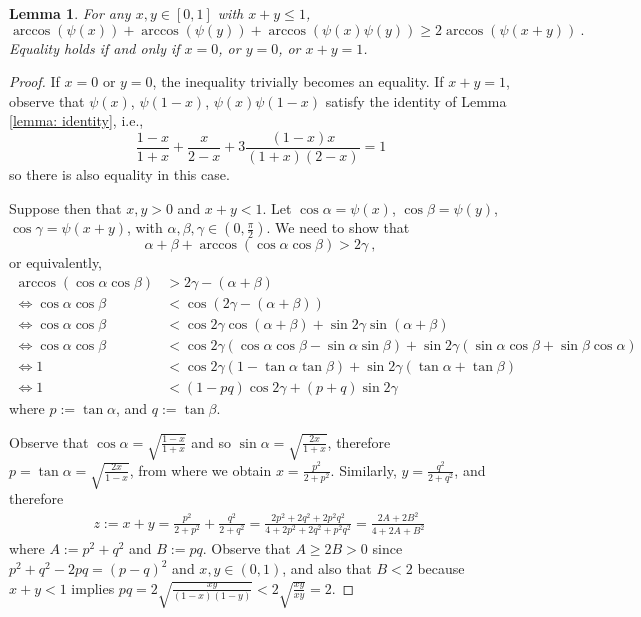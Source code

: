 \documentclass[reqno,hidelinks,11pt]{amsart}
\numberwithin{equation}{section}
\newtheorem{lemma}[theorem]{Lemma}
\begin{document}
\begin{lemma}\label{lemma: arccos psi}
    For any $x,y\in[0,1]$ with $x+y\le1$,
    \[
    \arccos(\psi(x))+\arccos(\psi(y))+\arccos(\psi(x)\psi(y))\ge2\arccos(\psi(x+y))~.
    \]
    Equality holds if and only if $x=0$, or $y=0$, or $x+y=1$.
\end{lemma}
\begin{proof}
    If $x=0$ or $y=0$, the inequality trivially becomes an equality. If $x+y=1$, observe that $\psi(x)$, $\psi(1-x)$, $\psi(x)\psi(1-x)$ satisfy the identity of Lemma \ref{lemma: identity}, i.e., 
    \[
    \frac{1-x}{1+x}+\frac{x}{2-x}+3\frac{(1-x)x}{(1+x)(2-x)}=1
    \]
    so there is also equality in this case.
    
    Suppose then that $x,y>0$ and $x+y<1$. Let $\cos\alpha=\psi(x)$, $\cos\beta=\psi(y)$, $\cos\gamma=\psi(x+y)$, with $\alpha,\beta,\gamma\in(0,\frac{\pi}2)$. We need to show that
    \[
    \alpha+\beta+\arccos(\cos\alpha\cos\beta)>2\gamma~,
    \]
    or equivalently,
    \begin{align*}
        \arccos(\cos\alpha\cos\beta)&> 2\gamma-(\alpha+\beta)\\
        \Leftrightarrow \cos\alpha\cos\beta&< \cos(2\gamma-(\alpha+\beta))\\
        \Leftrightarrow \cos\alpha\cos\beta&< \cos2\gamma\cos(\alpha+\beta)+\sin2\gamma\sin(\alpha+\beta)\\
        \Leftrightarrow \cos\alpha\cos\beta&< \cos2\gamma(\cos\alpha\cos\beta-\sin\alpha\sin\beta)+\sin2\gamma(\sin\alpha\cos\beta+\sin\beta\cos\alpha)\\
        \Leftrightarrow 1&< \cos2\gamma(1-\tan\alpha\tan\beta)+\sin2\gamma(\tan\alpha+\tan\beta)\\
        \Leftrightarrow 1&< (1-pq)\cos2\gamma+(p+q)\sin2\gamma
    \end{align*}
    where $p:=\tan\alpha$, and $q:=\tan\beta$.

    Observe that $\cos\alpha=\sqrt{\frac{1-x}{1+x}}$ and so $\sin\alpha=\sqrt{\frac{2x}{1+x}}$, therefore $p=\tan\alpha=\sqrt{\frac{2x}{1-x}}$, from where we obtain $x=\frac{p^2}{2+p^2}$. Similarly, $y=\frac{q^2}{2+q^2}$, and therefore
    \begin{align*}
        z:=x+y=\frac{p^2}{2+p^2}+\frac{q^2}{2+q^2}=\frac{2p^2+2q^2+2p^2q^2}{4+2p^2+2q^2+p^2q^2}=\frac{2A+2B^2}{4+2A+B^2}~
    \end{align*}
    where $A:=p^2+q^2$ and $B:=pq$. Observe that $A\ge 2B>0$ since $p^2+q^2-2pq=(p-q)^2$ and $x,y\in(0,1)$, and also that $B<2$ because $x+y<1$ implies $pq=2\sqrt{\frac{xy}{(1-x)(1-y)}}<2\sqrt{\frac{xy}{xy}}=2$.


\end{proof}
\end{document}
